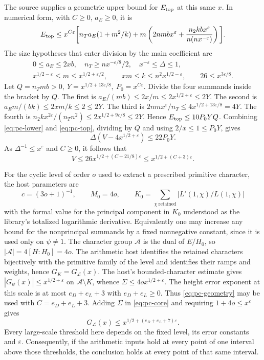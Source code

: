 The source supplies a geometric upper bound for \(E_{\rm top}\) at
this same \(x\). In numerical form, with \(C\geq0\), \(a_E\geq0\), it is
\begin{align}
 E_{\rm top}\leq x^{C\varepsilon}\bigg[
 n_T a_E(1+m^2/k)
 +m\left(2nmbx^\varepsilon+
       \frac{n_2 k b x^\varepsilon}{n(n x^{-\varepsilon})}\right)\bigg].
 \label{eq:pc-geometry}
\end{align}
The size hypotheses that enter division by the main coefficient are
\[
 \begin{gathered}
 0\leq a_E\leq2xb,\quad n_T\geq nx^{-\varepsilon/8}/2,
 \quad x^{-\varepsilon}\leq\Delta\leq1,\\
 x^{1/2-\varepsilon}\leq m\leq x^{1/2+\varepsilon/2},\qquad
 xm\leq k\leq n^2x^{1/2-\varepsilon},\qquad
 26\leq x^{3\varepsilon/8}.
 \end{gathered}
\]
Let \(Q=n_Tmb>0,\ Y=x^{1/2+13\varepsilon/8},\ P_0=x^{C\varepsilon}\).
Divide the four summands inside the bracket by \(Q\).
The first is \(a_E/(mb)\leq2x/m\leq2x^{1/2+\varepsilon}\leq2Y\).
The second is \(a_E m/(bk)\leq2xm/k\leq2\leq2Y\).
The third is \(2nm x^\varepsilon/n_T
      \leq4x^{1/2+13\varepsilon/8}=4Y\).
The fourth is \(n_2 k x^{2\varepsilon}/(n_Tn^2)
      \leq2x^{1/2+9\varepsilon/8}\leq2Y\).
Hence \(E_{\rm top}\leq10P_0YQ\). Combining
\eqref{eq:pc-lower} and \eqref{eq:pc-top}, dividing by \(Q\)
and using \(2/x\leq1\leq P_0Y\), gives
\[
 \Delta(V-4x^{1/2+\varepsilon})\leq22P_0Y .
\]
As \(\Delta^{-1}\leq x^\varepsilon\) and \(C\geq0\), it follows that
\begin{equation}
 V\leq26x^{1/2+(C+21/8)\varepsilon}
       \leq x^{1/2+(C+3)\varepsilon}.
 \label{eq:pc-core}
\end{equation}

For the cyclic level of order \(o\) used to extract a prescribed
primitive character, the host parameters are
\[
 c=(3o+1)^{-1},\qquad M_0=4o,\qquad
 K_0=\sum_{\chi\ \mathrm{retained}} |L'(1,\chi)/L(1,\chi)|
\]
with the formal value for the principal component in \(K_0\) understood
as the library's totalized logarithmic derivative. Equivalently one
may increase any bound for the nonprincipal summands by a fixed
nonnegative constant, since it is used only on \(\psi\ne1\).
The character group \(\mathcal A\) is the dual of \(E/H_0\),
so \(|\mathcal A|=4[H:H_0]=4o\).
The arithmetic host identifies the retained characters bijectively
with the primitive family of the level and identifies their ramps
and weights, hence \(G_K=G_{\mathcal L}(x)\).
The host's bounded-character estimate gives
\(|G_\psi(x)|\leq x^{1/2+\varepsilon}\) on
\(\mathcal A\setminus K\), whence \(\Sigma\leq4o x^{1/2+\varepsilon}\).
The height error exponent at this scale is at most \(e_D+e_L+3\)
with \(e_D+e_L\geq0\). Thus \eqref{eq:pc-geometry} may be used with
\(C=e_D+e_L+3\). Adding \(\Sigma\) in \eqref{eq:pc-core} and requiring
\(1+4o\leq x^\varepsilon\) gives
\[
 G_{\mathcal L}(x)\leq x^{1/2+(e_D+e_L+7)\varepsilon}.
\]
Every large-scale threshold here depends on the fixed level, its
error constants and \(\varepsilon\). Consequently, if the arithmetic
inputs hold at every point of one interval above those thresholds,
the conclusion holds at every point of that same interval.

